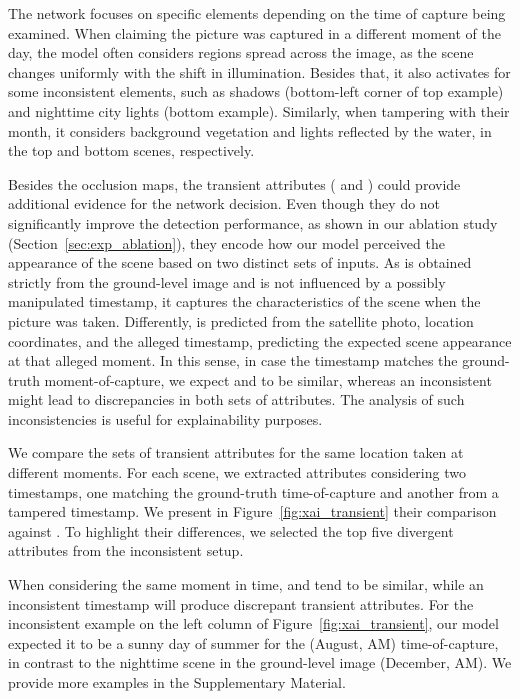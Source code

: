\documentclass[journal]{IEEEtran}
\begin{document}
        The network focuses on specific elements depending on the time of capture being examined. When claiming the picture was captured in a different moment of the day, the model often considers regions spread across the image, as the scene changes uniformly with the shift in illumination. Besides that, it also activates for some inconsistent elements, such as shadows (bottom-left corner of top example) and nighttime city lights (bottom example). Similarly, when tampering with their month, it considers background vegetation and lights reflected by the water, in the top and bottom scenes, respectively.
        
        Besides the occlusion maps, the transient attributes ( and ) could provide additional evidence for the network decision. Even though they do not significantly improve the detection performance, as shown in our ablation study (Section~\ref{sec:exp_ablation}), they encode how our model perceived the appearance of the scene based on two distinct sets of inputs. As  is obtained strictly from the ground-level image and is not influenced by a possibly manipulated timestamp, it captures the characteristics of the scene when the picture was taken. Differently,  is predicted from the satellite photo, location coordinates, and the alleged timestamp, predicting the expected scene appearance at that alleged moment. In this sense, in case the timestamp  matches the ground-truth moment-of-capture, we expect  and  to be similar, whereas an inconsistent  might lead to discrepancies in both sets of attributes. The analysis of such inconsistencies is useful for explainability purposes.
        
        We compare the sets of transient attributes for the same location taken at different moments. For each scene, we extracted attributes  considering two timestamps, one matching the ground-truth time-of-capture and another from a tampered timestamp. We present in Figure~\ref{fig:xai_transient} their comparison against . To highlight their differences, we selected the top five divergent attributes from the inconsistent setup.
        
        When considering the same moment in time,  and  tend to be similar, while an inconsistent timestamp will produce discrepant transient attributes. For the inconsistent example on the left column of Figure~\ref{fig:xai_transient}, our model expected it to be a sunny day of summer for the (August, \textsc{AM}) time-of-capture, in contrast to the nighttime scene in the ground-level image (December, \textsc{AM}). We provide more examples in the Supplementary Material.
        
\end{document}
